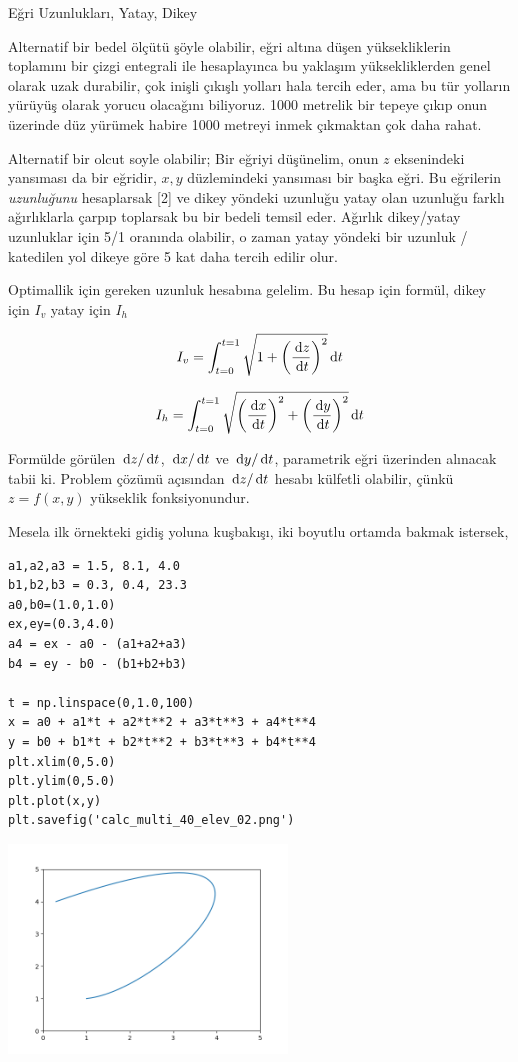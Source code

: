 \documentclass[12pt,fleqn]{article}\usepackage{../../common}
\begin{document}
Eğri Uzunlukları, Yatay, Dikey

Alternatif bir bedel ölçütü şöyle olabilir, eğri altına düşen yüksekliklerin
toplamını bir çizgi entegrali ile hesaplayınca bu yaklaşım yüksekliklerden genel
olarak uzak durabilir, çok inişli çıkışlı yolları hala tercih eder, ama bu tür
yolların yürüyüş olarak yorucu olacağını biliyoruz. 1000 metrelik bir tepeye
çıkıp onun üzerinde düz yürümek habire 1000 metreyi inmek çıkmaktan çok daha
rahat.

Alternatif bir olcut soyle olabilir; Bir eğriyi düşünelim, onun $z$ eksenindeki
yansıması da bir eğridir, $x,y$ düzlemindeki yansıması bir başka eğri. Bu
eğrilerin {\em uzunluğunu} hesaplarsak [2] ve dikey yöndeki uzunluğu yatay olan
uzunluğu farklı ağırlıklarla çarpıp toplarsak bu bir bedeli temsil eder. Ağırlık
dikey/yatay uzunluklar için 5/1 oranında olabilir, o zaman yatay yöndeki bir
uzunluk / katedilen yol dikeye göre 5 kat daha tercih edilir olur.

Optimallik için gereken uzunluk hesabına gelelim. Bu hesap için
formül, dikey için $I_v$ yatay için $I_h$

$$
I_v = \int_{t=0}^{t=1} \sqrt{1 + \left(\frac{\,\mathrm{d} z}{\,\mathrm{d} t} \right)^2 } \,\mathrm{d} t
$$

$$
I_h = \int_{t=0}^{t=1} \sqrt{
\left(\frac{\,\mathrm{d} x}{\,\mathrm{d} t} \right)^2 + 
\left(\frac{\,\mathrm{d} y}{\,\mathrm{d} t} \right)^2
} 
\,\mathrm{d} t
$$

Formülde görülen $\,\mathrm{d} z/\,\mathrm{d} t$, $\,\mathrm{d} x/\,\mathrm{d} t$ ve $\,\mathrm{d} y/\,\mathrm{d} t$, parametrik eğri
üzerinden alınacak tabii ki. Problem çözümü açısından $\,\mathrm{d} z/\,\mathrm{d} t$ hesabı
külfetli olabilir, çünkü $z = f(x,y)$ yükseklik fonksiyonundur.

Mesela ilk örnekteki gidiş yoluna kuşbakışı, iki boyutlu ortamda bakmak
istersek,

\begin{verbatim}
a1,a2,a3 = 1.5, 8.1, 4.0
b1,b2,b3 = 0.3, 0.4, 23.3
a0,b0=(1.0,1.0)
ex,ey=(0.3,4.0)
a4 = ex - a0 - (a1+a2+a3)
b4 = ey - b0 - (b1+b2+b3)
  
t = np.linspace(0,1.0,100)
x = a0 + a1*t + a2*t**2 + a3*t**3 + a4*t**4 
y = b0 + b1*t + b2*t**2 + b3*t**3 + b4*t**4
plt.xlim(0,5.0)
plt.ylim(0,5.0)
plt.plot(x,y)
plt.savefig('calc_multi_40_elev_02.png')
\end{verbatim}

\includegraphics[width=20em]{calc_multi_40_elev_02.png}
\end{document}
